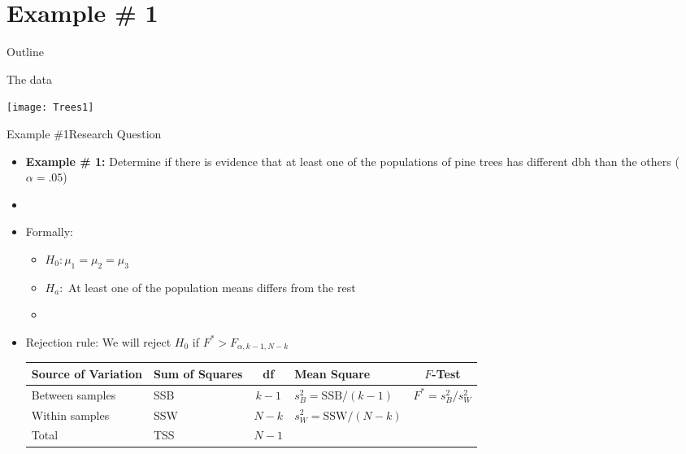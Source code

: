 \documentclass[xcolor=dvipsnames]{beamer}
\begin{document}
\section{Example \# 1}
\begin{frame}{Outline}
	\tableofcontents[currentsection,subsectionstyle=show/shaded/hide]
\end{frame}

\begin{frame}{The data}
	\begin{center}
		\texttt{[image: Trees1]}
	\end{center}
\end{frame}

\begin{frame}{Example \#1}{Research Question}
	\begin{itemize}
		\item \textbf{Example \# 1:} Determine if there is evidence that at least one of the populations of pine trees has different dbh than the others ($\alpha = .05$)
		\item[]
		\item Formally:
		\begin{itemize}
			\item $H_0: \mu_1 = \mu_2 = \mu_3$
			\item $H_a:$ At least one of the population means differs from the rest
			\item[]
		\end{itemize}
		\item Rejection rule: We will reject $H_0$ if $F^* > F_{\alpha, k-1, N-k}$
			\vspace{2mm}
		\begin{center}
			{\scriptsize
				\begin{tabular}{lp{1.2cm}cp{2.5cm}c}
					\hline 
					\textbf{Source of Variation} & \textbf{Sum of Squares} & \textbf{df} & \textbf{Mean Square} & $F$-\textbf{Test} \\ \hline 
					Between samples & SSB & $k - 1$ & $s_B^2 = \text{SSB} / (k-1)$ & $F^* = s_B^2 / s_W^2$ \\
					Within samples & SSW & $N - k$ &  $s_W^2 = \text{SSW} / (N-k)$ & \\
					Total & TSS & $N-1$ & & \\ \hline
			\end{tabular}}
		\end{center}
	\end{itemize}
\end{frame}
\end{document}
